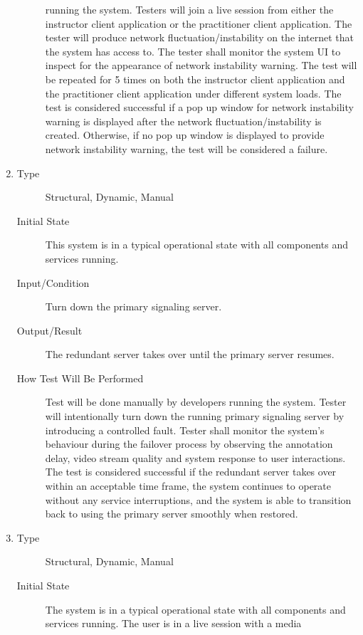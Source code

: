 \documentclass[12pt, titlepage]{article}
\begin{document}
\begin{enumerate}[NFR-T1]
\begin{description}
    running the system. Testers will join a live session from either the
    instructor client application or the practitioner client application. The
    tester will produce network fluctuation/instability on the internet that the
    system has access to. The tester shall monitor the system UI to inspect for
    the appearance of network instability warning. The test will be repeated for
    5 times on both the instructor client application and the practitioner
    client application under different system loads. The test is considered
    successful if a pop up window for network instability warning is displayed
    after the network fluctuation/instability is created. Otherwise, if no pop
    up window is displayed to provide network instability warning, the test will
    be considered a failure.
  \end{description}
\item \label{NFRT9}
  \begin{description}
  \item[Type] Structural, Dynamic, Manual
  \item[Initial State] This system is in a typical operational state with all
    components and services running.
  \item[Input/Condition] Turn down the primary signaling server.
  \item[Output/Result] The redundant server takes over until the primary server
    resumes.
  \item[How Test Will Be Performed] Test will be done manually by developers
    running the system. Tester will intentionally turn down the running primary
    signaling server by introducing a controlled fault. Tester shall monitor the
    system’s behaviour during the failover process by observing the annotation
    delay, video stream quality and system response to user interactions. The
    test is considered successful if the redundant server takes over within an
    acceptable time frame, the system continues to operate without any service
    interruptions, and the system is able to transition back to using the
    primary server smoothly when restored.
  \end{description}
\item \label{NFRT10}
  \begin{description}
  \item[Type] Structural, Dynamic, Manual
  \item[Initial State] The system is in a typical operational state with all
    components and services running. The user is in a live session with a media

\end{description}
\end{enumerate}
\end{document}
